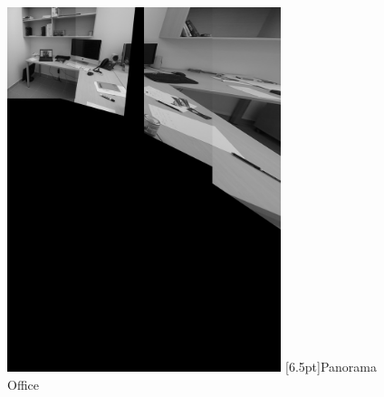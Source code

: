 \documentclass[12pt,a4paper]{report}
\begin{document}
\begin{figure}[!htb]
\centering
\includegraphics[width=8cm]{panorama2}
[6.5pt]{Panorama Office}
\end{figure}
\end{document}
